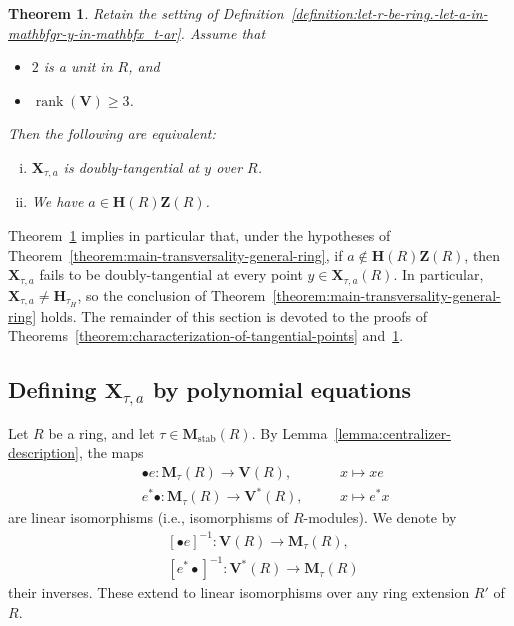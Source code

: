 \documentclass[reqno]{amsart}
\DeclareMathOperator{\stab}{stab}
\DeclareMathOperator{\rank}{rank}
\theoremstyle{plain} \newtheorem{theorem} {Theorem} \newtheorem{conjecture} {Conjecture} \newtheorem{corollary} [theorem] {Corollary} \newtheorem{proposition} [theorem] {Proposition} \newtheorem{fact} [theorem] {Fact}
\theoremstyle{definition} \newtheorem{definition} [theorem] {Definition}
\theoremstyle{itplain} %
\begin{document}
\begin{theorem}\label{theorem:reta-sett-defin-refd-r-be-ring.-let-mathbfgr-y-mat-doubly-tangential}
  Retain the setting of Definition~\ref{definition:let-r-be-ring.-let-a-in-mathbfgr-y-in-mathbfx_t-ar}.  Assume that
  \begin{itemize}
  \item $2$ is a unit in $R$, and
  \item $\rank(\mathbf{V}) \geq 3$.
  \end{itemize}
  Then the following are equivalent:
  \begin{enumerate}[(i)]
  \item $\mathbf{X}_{\tau,a}$ is doubly-tangential at $y$ over $R$.
  \item We have $a \in \mathbf{H}(R) \mathbf{Z}(R)$.
  \end{enumerate}
\end{theorem}

Theorem~\ref{theorem:reta-sett-defin-refd-r-be-ring.-let-mathbfgr-y-mat-doubly-tangential} implies in particular that, under the hypotheses of Theorem~\ref{theorem:main-transversality-general-ring}, if $a \notin \mathbf{H}(R) \mathbf{Z}(R)$, then $\mathbf{X}_{\tau,a}$ fails to be doubly-tangential at every point $y \in \mathbf{X}_{\tau,a}(R)$.  In particular, $\mathbf{X}_{\tau,a} \neq \mathbf{H}_{\tau_H}$, so the conclusion of Theorem~\ref{theorem:main-transversality-general-ring} holds.  The remainder of this section is devoted to the proofs of Theorems~\ref{theorem:characterization-of-tangential-points} and~\ref{theorem:reta-sett-defin-refd-r-be-ring.-let-mathbfgr-y-mat-doubly-tangential}.


\subsection{Defining $\mathbf{X}_{\tau,a}$ by polynomial equations}\label{Sec:polyEqn}
Let $R$ be a ring, and let $\tau \in \mathbf{M}_{\stab}(R)$.  By Lemma~\ref{lemma:centralizer-description}, the maps
\begin{align*}
  &\bullet e : \mathbf{M}_{\tau}(R) \rightarrow \mathbf{V}(R), \quad &&x \mapsto x e \\
  &e^* \bullet  : \mathbf{M}_{\tau}(R) \rightarrow \mathbf{V}^*(R), \quad &&x \mapsto e^* x 
\end{align*}
are linear isomorphisms (i.e., isomorphisms of $R$-modules).  We denote by
\begin{align*}
  &{[\bullet e]}^{-1} : \mathbf{V}(R) \rightarrow \mathbf{M}_\tau(R), \quad \\
  &{[e^* \bullet]}^{-1} : \mathbf{V}^*(R) \rightarrow \mathbf{M}_\tau(R) 
\end{align*}
their inverses.  These extend to linear isomorphisms over any ring extension $R'$ of $R$.
\end{document}
